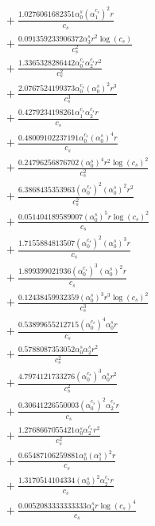 \documentclass[10pt]{article}
\begin{document}
\begin{align*}
&{}  + \frac{1.0276061682351 \alpha_{0}^s \left(\alpha_{1}^{c_s}\right)^{2} r}{c_{s}} \\
&{}  + \frac{0.091359233906372 \alpha_{3}^s r^{2} \log{\left(c_{s} \right)}}{c_{s}^{2}} \\
&{}  + \frac{1.3365328286442 \alpha_{0}^{c_s} \alpha_{2}^{c_s} r^{2}}{c_{s}^{2}} \\
&{}  + \frac{2.0767524199373 \alpha_{0}^{c_s} \left(\alpha_{0}^s\right)^{2} r^{3}}{c_{s}^{3}} \\
&{}  + \frac{0.4279234198261 \alpha_{1}^{c_s} \alpha_{2}^{c_s} r}{c_{s}} \\
&{}  + \frac{0.48009102237191 \alpha_{0}^{c_s} \left(\alpha_{0}^s\right)^{4} r}{c_{s}} \\
&{}  + \frac{0.24796256876702 \left(\alpha_{0}^s\right)^{4} r^{2} \log{\left(c_{s} \right)}^{2}}{c_{s}^{2}} \\
&{}  + \frac{6.3868435353963 \left(\alpha_{0}^{c_s}\right)^{2} \left(\alpha_{0}^s\right)^{2} r^{2}}{c_{s}^{2}} \\
&{}  + \frac{0.051404189589007 \left(\alpha_{0}^s\right)^{5} r \log{\left(c_{s} \right)}^{2}}{c_{s}} \\
&{}  + \frac{1.7155884813507 \left(\alpha_{0}^{c_s}\right)^{2} \left(\alpha_{0}^s\right)^{3} r}{c_{s}} \\
&{}  + \frac{1.899399021936 \left(\alpha_{0}^{c_s}\right)^{3} \left(\alpha_{0}^s\right)^{2} r}{c_{s}} \\
&{}  + \frac{0.12438459932359 \left(\alpha_{0}^s\right)^{3} r^{3} \log{\left(c_{s} \right)}^{2}}{c_{s}^{3}} \\
&{}  + \frac{0.53899655212715 \left(\alpha_{0}^{c_s}\right)^{4} \alpha_{0}^s r}{c_{s}} \\
&{}  + \frac{0.5788087353052 \alpha_{0}^s \alpha_{2}^s r^{2}}{c_{s}^{2}} \\
&{}  + \frac{4.7974121733276 \left(\alpha_{0}^{c_s}\right)^{3} \alpha_{0}^s r^{2}}{c_{s}^{2}} \\
&{}  + \frac{0.30641226550003 \left(\alpha_{0}^{c_s}\right)^{2} \alpha_{2}^{c_s} r}{c_{s}} \\
&{}  + \frac{1.2768667055421 \alpha_{0}^s \alpha_{2}^{c_s} r^{2}}{c_{s}^{2}} \\
&{}  + \frac{0.65487106259881 \alpha_{0}^s \left(\alpha_{1}^s\right)^{2} r}{c_{s}} \\
&{}  + \frac{1.3170514104334 \left(\alpha_{0}^s\right)^{2} \alpha_{2}^{c_s} r}{c_{s}} \\
&{}  + \frac{0.0052083333333333 \alpha_{4}^s r \log{\left(c_{s} \right)}^{4}}{c_{s}} \\

\end{align*}
\end{document}
